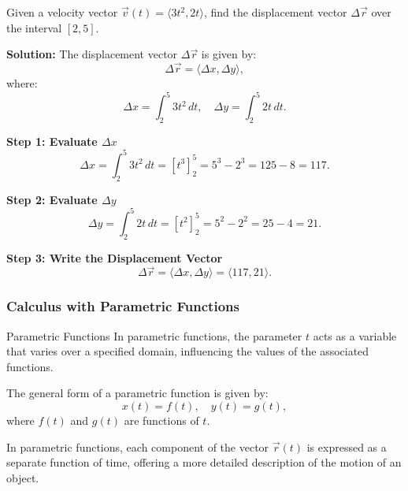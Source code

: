 \documentclass[12pt]{article}
\theoremstyle{beautifulthm}
\begin{document}
\begin{tcolorbox}[colback=examplebg, colframe=red!75!black, title=\textbf{EXAMPLE 1: Finding the Displacement Vector}, fonttitle=\bfseries, sharp corners]
Given a velocity vector $\vec{v}(t) = \langle 3t^2, 2t \rangle$, find the displacement vector $\Delta \vec{r}$ over the interval $[2, 5]$.


\tcblower
\textbf{Solution:} 
The displacement vector $\Delta \vec{r}$ is given by:
\[
\Delta \vec{r} = \langle \Delta x, \Delta y \rangle,
\]
where:
\[
\Delta x = \int_2^5 3t^2 \, dt, \quad \Delta y = \int_2^5 2t \, dt.
\]

\noindent\textbf{Step 1: Evaluate $\Delta x$}
\[
\Delta x = \int_2^5 3t^2 \, dt = \left[t^3\right]_2^5 = 5^3 - 2^3 = 125 - 8 = 117.
\]

\noindent\textbf{Step 2: Evaluate $\Delta y$}
\[
\Delta y = \int_2^5 2t \, dt = \left[t^2\right]_2^5 = 5^2 - 2^2 = 25 - 4 = 21.
\]

\noindent\textbf{Step 3: Write the Displacement Vector}
\[
\Delta \vec{r} = \langle \Delta x, \Delta y \rangle = \langle 117, 21 \rangle.
\]
\end{tcolorbox}
\newpage
\subsubsection{Calculus with Parametric Functions}

\begin{Note}{Parametric Functions}{}
     In parametric functions, the parameter $t$ acts as a variable that varies over a specified domain, influencing the values of the associated functions. 

The general form of a parametric function is given by:
\[
x(t) = f(t), \quad y(t) = g(t),
\]
where $f(t)$ and $g(t)$ are functions of $t$.

\vspace{3mm}
In parametric functions, each component of the vector $\vec{r}(t)$ is expressed as a separate function of time, offering a more detailed description of the motion of an object. 
\end{Note}
\end{document}
